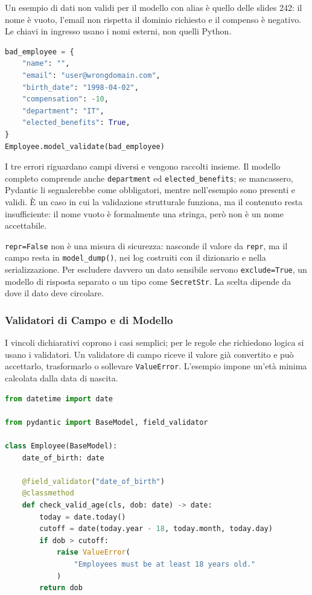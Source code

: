\documentclass[12pt]{extarticle}
\begin{document}
\noindent Un esempio di dati non validi per il modello con alias è quello delle slides 242: il nome è vuoto, l'email non rispetta il dominio richiesto e il compenso è negativo. Le chiavi in ingresso usano i nomi esterni, non quelli Python.

\begin{lstlisting}[language=Python]
bad_employee = {
    "name": "",
    "email": "user@wrongdomain.com",
    "birth_date": "1998-04-02",
    "compensation": -10,
    "department": "IT",
    "elected_benefits": True,
}
Employee.model_validate(bad_employee)
\end{lstlisting}

\noindent I tre errori riguardano campi diversi e vengono raccolti insieme. Il modello completo comprende anche \texttt{department} ed \texttt{elected\_benefits}; se mancassero, Pydantic li segnalerebbe come obbligatori, mentre nell'esempio sono presenti e validi. È un caso in cui la validazione strutturale funziona, ma il contenuto resta insufficiente: il nome vuoto è formalmente una stringa, però non è un nome accettabile.

\noindent \texttt{repr=False} non è una misura di sicurezza: nasconde il valore da \texttt{repr}, ma il campo resta in \texttt{model\_dump()}, nei log costruiti con il dizionario e nella serializzazione. Per escludere davvero un dato sensibile servono \texttt{exclude=True}, un modello di risposta separato o un tipo come \texttt{SecretStr}. La scelta dipende da dove il dato deve circolare.

\subsubsection{Validatori di Campo e di Modello}

\noindent I vincoli dichiarativi coprono i casi semplici; per le regole che richiedono logica si usano i validatori. Un validatore di campo riceve il valore già convertito e può accettarlo, trasformarlo o sollevare \texttt{ValueError}. L'esempio impone un'età minima calcolata dalla data di nascita.

\begin{lstlisting}[language=Python]
from datetime import date

from pydantic import BaseModel, field_validator

class Employee(BaseModel):
    date_of_birth: date

    @field_validator("date_of_birth")
    @classmethod
    def check_valid_age(cls, dob: date) -> date:
        today = date.today()
        cutoff = date(today.year - 18, today.month, today.day)
        if dob > cutoff:
            raise ValueError(
                "Employees must be at least 18 years old."
            )
        return dob
\end{lstlisting}
\end{document}
